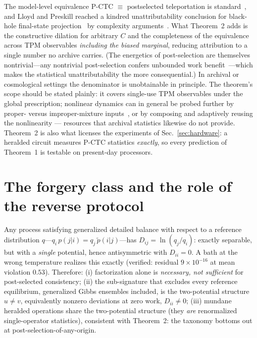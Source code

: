 \documentclass[aps,pra,twocolumn,superscriptaddress,nofootinbib]{revtex4-2}
\begin{document}
The model-level equivalence P-CTC $\equiv$ postselected teleportation is standard~\cite{lloyd2011pra,brunwilde2017sim}, and Lloyd and Preskill reached a kindred unattributability conclusion for black-hole final-state projection~\cite{horowitzmaldacena2004} by complexity arguments~\cite{lloydpreskill2014}. What Theorem~2 adds is the constructive dilation for arbitrary $C$ and the completeness of the equivalence across TPM observables \emph{including the biased marginal}, reducing attribution to a single number no archive carries. (The energetics of post-selection are themselves nontrivial---any nontrivial post-selection confers unbounded work benefit~\cite{purvesshort2021}---which makes the statistical unattributability the more consequential.) In archival or cosmological settings the denominator is unobtainable in principle. The theorem's scope should be stated plainly: it covers single-use TPM observables under the global prescription; nonlinear dynamics can in general be probed further by proper- versus improper-mixture inputs~\cite{blss2009}, or by composing and adaptively reusing the nonlinearity --- resources that archival statistics likewise do not provide. Theorem~2 is also what licenses the experiments of Sec.~\ref{sec:hardware}: a heralded circuit measures P-CTC statistics \emph{exactly}, so every prediction of Theorem~1 is testable on present-day processors.

\section{The forgery class and the role of the reverse protocol}
\label{sec:forgery}
Any process satisfying generalized detailed balance with respect to a reference distribution $q$---$q_i\,p(j|i)=q_j\,\tilde p(i|j)$---has $D_{ij}=\ln(q_j/q_i)$: exactly separable, but with a \emph{single} potential, hence antisymmetric with $D_{ii}=0$. A bath at the wrong temperature realizes this exactly (verified: residual $9\times10^{-16}$ at mean violation $0.53$). Therefore: (i) factorization alone is \emph{necessary, not sufficient} for post-selected consistency; (ii) the sub-signature that excludes every reference equilibrium, generalized Gibbs ensembles included, is the two-potential structure $u\neq v$, equivalently nonzero deviations at zero work, $D_{ii}\neq0$; (iii) mundane heralded operations share the two-potential structure (they \emph{are} renormalized single-operator statistics), consistent with Theorem~2: the taxonomy bottoms out at post-selection-of-any-origin.
\end{document}
